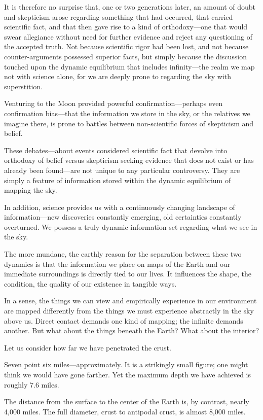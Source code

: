 It is therefore no surprise that, one or two generations later, an amount of doubt and skepticism arose regarding something that had occurred, that carried scientific fact, and that then gave rise to a kind of orthodoxy—one that would swear allegiance without need for further evidence and reject any questioning of the accepted truth. Not because scientific rigor had been lost, and not because counter-arguments possessed superior facts, but simply because the discussion touched upon the dynamic equilibrium that includes infinity—the realm we map not with science alone, for we are deeply prone to regarding the sky with superstition.

Venturing to the Moon provided powerful confirmation—perhaps even confirmation bias—that the information we store in the sky, or the relatives we imagine there, is prone to battles between non-scientific forces of skepticism and belief.

These debates—about events considered scientific fact that devolve into orthodoxy of belief versus skepticism seeking evidence that does not exist or has already been found—are not unique to any particular controversy. They are simply a feature of information stored within the dynamic equilibrium of mapping the sky.

In addition, science provides us with a continuously changing landscape of information—new discoveries constantly emerging, old certainties constantly overturned. We possess a truly dynamic information set regarding what we see in the sky.

The more mundane, the earthly reason for the separation between these two dynamics is that the information we place on maps of the Earth and our immediate surroundings is directly tied to our lives. It influences the shape, the condition, the quality of our existence in tangible ways.

In a sense, the things we can view and empirically experience in our environment are mapped differently from the things we must experience abstractly in the sky above us. Direct contact demands one kind of mapping; the infinite demands another. But what about the things beneath the Earth? What about the interior?

Let us consider how far we have penetrated the crust.

Seven point six miles—approximately. It is a strikingly small figure; one might think we would have gone farther. Yet the maximum depth we have achieved is roughly 7.6 miles.

The distance from the surface to the center of the Earth is, by contrast, nearly 4,000 miles. The full diameter, crust to antipodal crust, is almost 8,000 miles.

